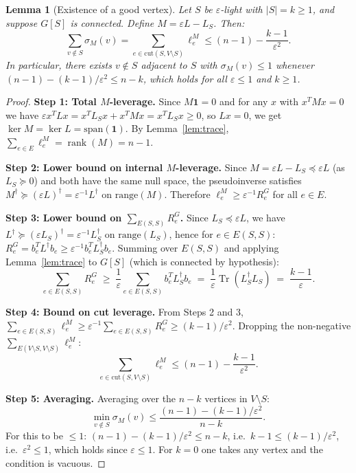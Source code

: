 \documentclass[12pt]{article}
\newtheorem{lemma}[theorem]{Lemma}
\begin{document}
\begin{lemma}[Existence of a good vertex]\label{lem:exist}
Let $S$ be $\varepsilon$-light with $|S|=k\geq 1$, and suppose
$G[S]$ is connected.  Define $M = \varepsilon L - L_S$.  Then:
\[
  \sum_{v\notin S}\sigma_M(v)
  = \sum_{e\in\mathrm{cut}(S,V\setminus S)}\ell_e^M
  \leq (n-1) - \frac{k-1}{\varepsilon^2}.
\]
In particular, there exists $v\notin S$ adjacent to $S$ with $\sigma_M(v)\leq 1$
whenever $(n-1)-(k-1)/\varepsilon^2 \leq n-k$, which holds for all $\varepsilon\leq 1$
and $k\geq 1$.
\end{lemma}
\begin{proof}
\textbf{Step 1: Total $M$-leverage.}
Since $M\mathbf{1}=0$ and for any $x$ with $x^TMx=0$ we have
$\varepsilon x^TLx = x^TL_Sx + x^TMx = x^TL_Sx \geq 0$, so $Lx=0$,
we get $\ker M = \ker L = \mathrm{span}(\mathbf{1})$.
By Lemma~\ref{lem:trace}, $\sum_{e\in E}\ell_e^M = \operatorname{rank}(M) = n-1$.

\textbf{Step 2: Lower bound on internal $M$-leverage.}
Since $M = \varepsilon L - L_S \preceq \varepsilon L$ (as $L_S\succeq 0$) and both have the
same null space, the pseudoinverse satisfies
$M^\dagger \succeq (\varepsilon L)^\dagger = \varepsilon^{-1}L^\dagger$ on $\mathrm{range}(M)$.
Therefore $\ell_e^M \geq \varepsilon^{-1}R_e^G$ for all $e\in E$.

\textbf{Step 3: Lower bound on $\sum_{E(S,S)}R_e^G$.}
Since $L_S \preceq \varepsilon L$, we have $L^\dagger \succeq (\varepsilon L_S)^\dagger
= \varepsilon^{-1}L_S^\dagger$ on $\mathrm{range}(L_S)$, hence for $e\in E(S,S)$:
$R_e^G = b_e^T L^\dagger b_e \geq \varepsilon^{-1} b_e^T L_S^\dagger b_e$.
Summing over $E(S,S)$ and applying Lemma~\ref{lem:trace} to $G[S]$
(which is connected by hypothesis):
\[
  \sum_{e\in E(S,S)}R_e^G
  \;\geq\; \frac{1}{\varepsilon}\sum_{e\in E(S,S)}b_e^T L_S^\dagger b_e
  \;=\; \frac{1}{\varepsilon}\operatorname{Tr}(L_S^\dagger L_S)
  \;=\; \frac{k-1}{\varepsilon}.
\]

\textbf{Step 4: Bound on cut leverage.}
From Steps 2 and 3, $\sum_{e\in E(S,S)}\ell_e^M \geq \varepsilon^{-1}\sum_{e\in E(S,S)}R_e^G
\geq (k-1)/\varepsilon^2$.
Dropping the non-negative $\sum_{E(V\setminus S,V\setminus S)}\ell_e^M$:
\[
  \sum_{e\in\mathrm{cut}(S,V\setminus S)}\ell_e^M
  \leq (n-1) - \frac{k-1}{\varepsilon^2}.
\]

\textbf{Step 5: Averaging.}
Averaging over the $n-k$ vertices in $V\setminus S$:
\[
  \min_{v\notin S}\sigma_M(v)
  \leq \frac{(n-1)-(k-1)/\varepsilon^2}{n-k}.
\]
For this to be $\leq 1$: $(n-1)-(k-1)/\varepsilon^2 \leq n-k$,
i.e.\ $k-1 \leq (k-1)/\varepsilon^2$, i.e.\ $\varepsilon^2 \leq 1$, which holds since
$\varepsilon\leq 1$.  For $k=0$ one takes any vertex and the condition is vacuous.
\end{proof}
\end{document}
